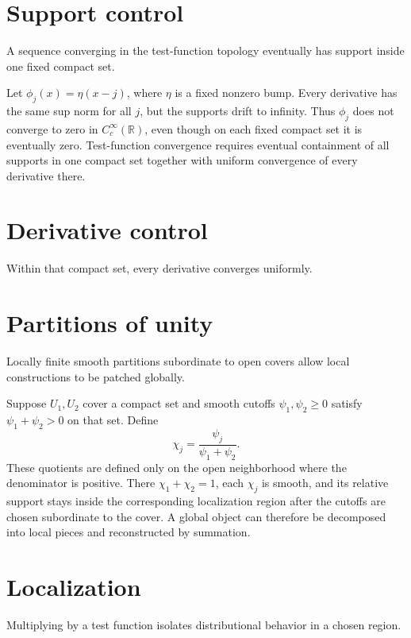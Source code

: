 \section{Support control}
A sequence converging in the test-function topology eventually has support inside one fixed compact set.


\begin{example}\label{ex:iii15-expand-02}
Let \(\phi_j(x)=\eta(x-j)\), where \(\eta\) is a fixed nonzero bump. Every
derivative has the same sup norm for all \(j\), but the supports drift to
infinity. Thus \(\phi_j\) does not converge to zero in
\(C_c^\infty(\mathbb R)\), even though on each fixed compact set it is
eventually zero. Test-function convergence requires eventual containment of all
supports in one compact set together with uniform convergence of every
derivative there.
\end{example}
\section{Derivative control}
Within that compact set, every derivative converges uniformly.

\section{Partitions of unity}
Locally finite smooth partitions subordinate to open covers allow local constructions to be patched globally.


\begin{example}\label{ex:iii15-expand-03}
Suppose \(U_1,U_2\) cover a compact set and smooth cutoffs
\(\psi_1,\psi_2\ge0\) satisfy \(\psi_1+\psi_2>0\) on that set. Define
\[
\chi_j=\frac{\psi_j}{\psi_1+\psi_2}.
\]
These quotients are defined only on the open neighborhood where the denominator is positive. There \(\chi_1+\chi_2=1\), each \(\chi_j\) is smooth, and its relative support stays
inside the corresponding localization region after the cutoffs are chosen
subordinate to the cover. A global object can therefore be decomposed into
local pieces and reconstructed by summation.
\end{example}
\section{Localization}
Multiplying by a test function isolates distributional behavior in a chosen region.

